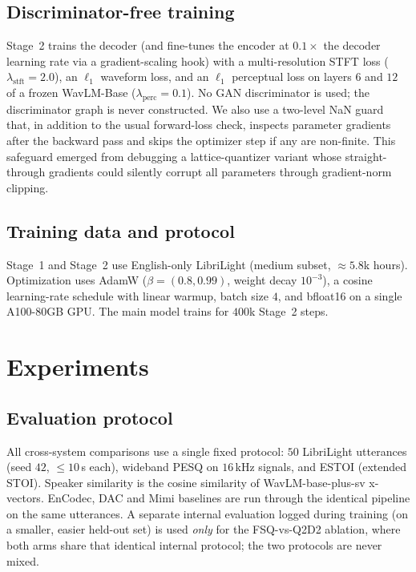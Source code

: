 \documentclass[conference,a4paper]{APSIPA2026}
\begin{document}
\subsection{Discriminator-free training}

Stage~2 trains the decoder (and fine-tunes the encoder at $0.1\times$ the
decoder learning rate via a gradient-scaling hook) with a multi-resolution STFT
loss ($\lambda_{\mathrm{stft}}{=}2.0$), an $\ell_1$ waveform loss, and an
$\ell_1$ perceptual loss on layers $6$ and $12$ of a frozen WavLM-Base
($\lambda_{\mathrm{perc}}{=}0.1$). No GAN discriminator is used; the
discriminator graph is never constructed. We also use a two-level NaN guard
that, in addition to the usual forward-loss check, inspects parameter
gradients after the backward pass and skips the optimizer step if any are
non-finite. This safeguard emerged from debugging a lattice-quantizer
variant whose straight-through gradients could silently corrupt all parameters
through gradient-norm clipping.

\subsection{Training data and protocol}

Stage~1 and Stage~2 use English-only LibriLight (medium subset,
$\approx 5.8$k hours). %
Optimization uses AdamW ($\beta=(0.8,0.99)$, weight decay $10^{-3}$), a
cosine learning-rate schedule with linear warmup, batch size $4$, and bfloat16
on a single A100-80GB GPU. The main model trains for $400$k Stage~2 steps.

\section{Experiments}

\subsection{Evaluation protocol}

All cross-system comparisons use a single fixed protocol: $50$ LibriLight
utterances (seed $42$, $\leq 10$\,s each), wideband PESQ on $16$\,kHz signals,
and ESTOI (extended STOI). %
Speaker similarity is the cosine similarity of WavLM-base-plus-sv x-vectors.
EnCodec, DAC and Mimi baselines are run through the identical pipeline on the
same utterances. A separate internal evaluation logged during training (on a
smaller, easier held-out set) is used \emph{only} for the FSQ-vs-Q2D2 ablation,
where both arms share that identical internal protocol; the two protocols are
never mixed.
\end{document}

